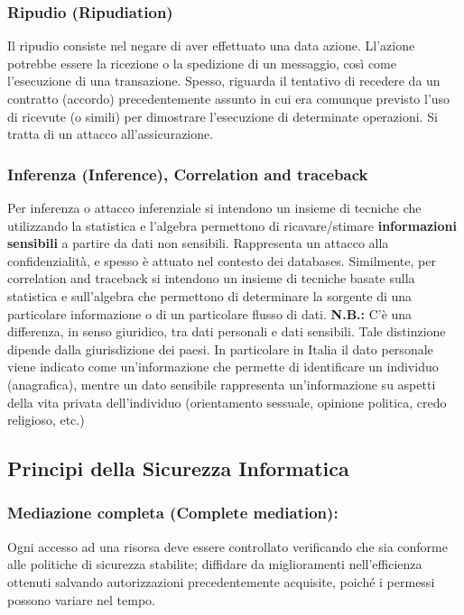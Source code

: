 \subsubsection{Ripudio (Ripudiation)}
Il ripudio consiste nel negare di aver effettuato una data azione. Ll’azione potrebbe essere la ricezione o la spedizione di un messaggio, così come l’esecuzione di una transazione. Spesso, riguarda il tentativo di recedere da un contratto (accordo) precedentemente assunto in cui era comunque previsto l’uso di ricevute (o simili) per dimostrare l’esecuzione di determinate operazioni. Si tratta di un attacco all’assicurazione.

\subsubsection{Inferenza (Inference), Correlation and traceback}
Per inferenza o attacco inferenziale si intendono un insieme di tecniche che utilizzando la statistica e l’algebra permettono di ricavare/stimare \textbf{informazioni sensibili} a partire da dati non sensibili. Rappresenta un attacco alla confidenzialità, e spesso è attuato nel contesto dei databases. Similmente, per correlation and traceback si intendono un insieme di tecniche basate sulla statistica e sull’algebra che permettono di determinare la sorgente di una particolare informazione o di un particolare flusso di dati.\newline \newline
\textbf{N.B.:} C'è una differenza, in senso giuridico, tra dati personali e dati sensibili. Tale distinzione dipende dalla giurisdizione dei paesi. In particolare in Italia il dato personale viene indicato come un'informazione che permette di identificare un individuo (anagrafica), mentre un dato sensibile rappresenta un'informazione su aspetti della vita privata dell'individuo (orientamento sessuale, opinione politica, credo religioso, etc.)

\subsection{Principi della Sicurezza Informatica}

\subsubsection{Mediazione completa (Complete mediation):} Ogni accesso ad una risorsa deve essere controllato verificando che sia conforme alle politiche di sicurezza stabilite; diffidare da miglioramenti nell’efficienza ottenuti salvando autorizzazioni precedentemente acquisite, poiché i permessi possono variare nel tempo.

